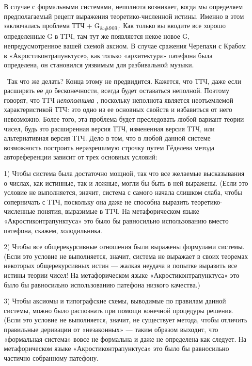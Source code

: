 В случае с формальными системами, неполнота возникает, когда мы определяем предполагаемый рецепт выражения теоретико-численной истины. Именно в этом заключалась проблема ТТЧ + G\textsubscript{\&\#969;}. Как только вы вводите все хорошо определенные G в ТТЧ, там тут же появляется некое новое G, непредусмотренное вашей схемой аксиом. В случае сражения Черепахи с Крабом в «Акростиконтрапунктусе», как только «архитектура» патефона была определена, он становился уязвимым для разбивальной музыки.

~Так что же делать? Конца этому не предвидится. Кажется, что ТТЧ, даже если расширять ее до бесконечности, всегда будет оставаться неполной. Поэтому говорят, что ТТЧ \emph{непополнима} , поскольку неполнота является неотъемлемой характеристикой ТТЧ: это одно из ее основных свойств и избавиться от него невозможно. Более того, эта проблема будет преследовать любой вариант теории чисел, будь это расширенная версия ТТЧ, измененная версия ТТЧ, или альтернативная версия ТТЧ. Дело в том, что в любой данной системе возможность построить неразрешимую строчку путем Гёделева метода автореференции зависит от трех основных условий:

1) Чтобы система была достаточно мощной, так что все желаемые высказывания о числах, как истинные, так и ложные, могли бы быть в ней выражены. (Если это условие не выполняется, значит, система с самого начала слишком слаба, чтобы соперничать с ТТЧ, поскольку она даже не способна выразить теоретико-численные понятия, выразимые в ТТЧ. На метафорическом языке «Акростиконтрапунктуса» это было бы равносильно использованию вместо патефона, скажем, холодильника.

2) Чтобы все общерекурсивные отношения были выражены формулами системы. (Если это условие не выполняется, значит, система не выражает в своих теоремах некоторых общерекурсивных истин --- жалкая неудача в попытке выразить все истины теории чисел! На метафорическом языке «Акростиконтрапунктуса» это было бы равносильно использованию патефона низкого качества.)

3) Чтобы аксиомы и типографские схемы, выводимые по правилам данной системы, можно было распознать при помощи конечной процедуры решения. (Если это условие не выполняется, значит, не существует метода, чтобы отличить правильные деривации от «незаконных» --- таким образом выходит, что «формальная система» вовсе не формальна и даже не определена как следует. На метафорическом языке «Акростиконтрапунктуса» это было бы равносильно частично собранному патефону.

